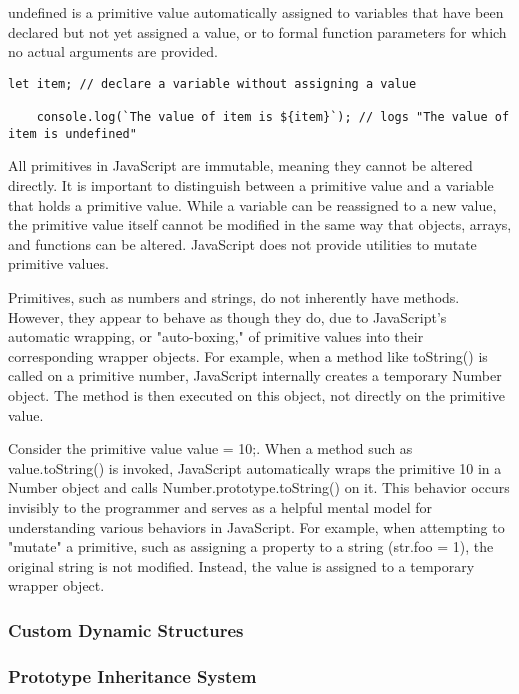 undefined is a primitive value automatically assigned to variables that have been declared but not yet assigned a value, or to formal function parameters for which no actual arguments are provided.

\begin{lstlisting}[caption=typeof null return "object" in JavaScript ]
	let item; // declare a variable without assigning a value

	console.log(`The value of item is ${item}`); // logs "The value of item is undefined"

\end{lstlisting}

All primitives in JavaScript are immutable, meaning they cannot be altered directly. It is important to distinguish between a primitive value and a variable that holds a primitive value. While a variable can be reassigned to a new value, the primitive value itself cannot be modified in the same way that objects, arrays, and functions can be altered. JavaScript does not provide utilities to mutate primitive values.

Primitives, such as numbers and strings, do not inherently have methods. However, they appear to behave as though they do, due to JavaScript's automatic wrapping, or "auto-boxing," of primitive values into their corresponding wrapper objects. For example, when a method like toString() is called on a primitive number, JavaScript internally creates a temporary Number object. The method is then executed on this object, not directly on the primitive value.

Consider the primitive value value = 10;. When a method such as value.toString() is invoked, JavaScript automatically wraps the primitive 10 in a Number object and calls Number.prototype.toString() on it. This behavior occurs invisibly to the programmer and serves as a helpful mental model for understanding various behaviors in JavaScript. For example, when attempting to "mutate" a primitive, such as assigning a property to a string (str.foo = 1), the original string is not modified. Instead, the value is assigned to a temporary wrapper object.

\subsubsection{Custom Dynamic Structures}

\subsubsection{Prototype Inheritance System}

